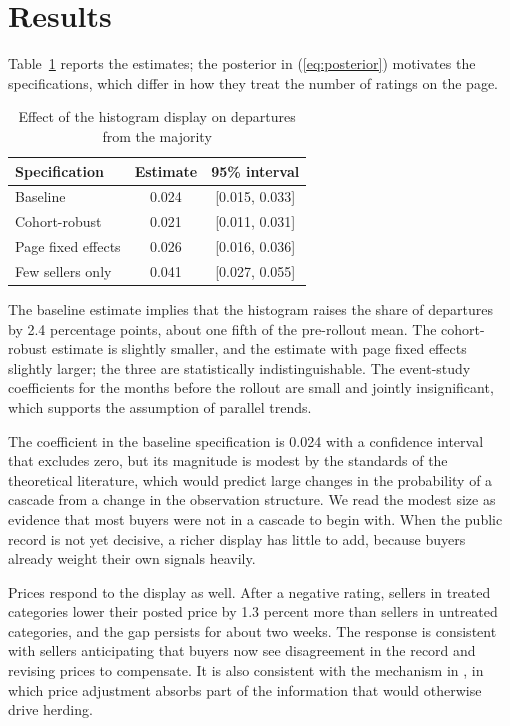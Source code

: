 \documentclass[12pt]{article}
\begin{document}
\section{Results}
Table~\ref{tab:main} reports the estimates; the posterior in (\ref{eq:posterior}) motivates the specifications, which differ in how they treat the number of ratings on the page.
\begin{table}[h]
\centering
\caption{Effect of the histogram display on departures from the majority}\label{tab:main}
\begin{tabular}{lcc}
\hline
Specification & Estimate & 95\% interval \\
\hline
Baseline & 0.024 & [0.015, 0.033] \\
Cohort-robust & 0.021 & [0.011, 0.031] \\
Page fixed effects & 0.026 & [0.016, 0.036] \\
Few sellers only & 0.041 & [0.027, 0.055] \\
\hline
\end{tabular}
\end{table}
The baseline estimate implies that the histogram raises the share of departures by 2.4 percentage points, about one fifth of the pre-rollout mean. The cohort-robust estimate is slightly smaller, and the estimate with page fixed effects slightly larger; the three are statistically indistinguishable. The event-study coefficients for the months before the rollout are small and jointly insignificant, which supports the assumption of parallel trends.

The coefficient in the baseline specification is 0.024 with a confidence interval that excludes zero, but its magnitude is modest by the standards of the theoretical literature, which would predict large changes in the probability of a cascade from a change in the observation structure. We read the modest size as evidence that most buyers were not in a cascade to begin with. When the public record is not yet decisive, a richer display has little to add, because buyers already weight their own signals heavily.

Prices respond to the display as well. After a negative rating, sellers in treated categories lower their posted price by 1.3 percent more than sellers in untreated categories, and the gap persists for about two weeks. The response is consistent with sellers anticipating that buyers now see disagreement in the record and revising prices to compensate. It is also consistent with the mechanism in \citet{avery1998}, in which price adjustment absorbs part of the information that would otherwise drive herding.
\end{document}
